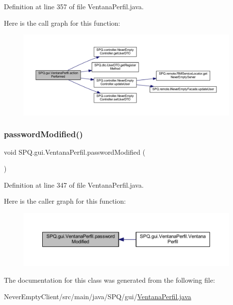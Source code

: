 Definition at line 357 of file Ventana\+Perfil.\+java.

Here is the call graph for this function\+:
\nopagebreak
\begin{figure}[H]
\begin{center}
\leavevmode
\includegraphics[width=350pt]{class_s_p_q_1_1gui_1_1_ventana_perfil_ab3748a16025307c203ba1dd2c5385b23_cgraph}
\end{center}
\end{figure}
\mbox{\label{class_s_p_q_1_1gui_1_1_ventana_perfil_a65b1807fdef3dcfdaf5564d2148fc46d}} 
\subsubsection{\texorpdfstring{password\+Modified()}{passwordModified()}}
{\footnotesize\ttfamily void S\+P\+Q.\+gui.\+Ventana\+Perfil.\+password\+Modified (\begin{DoxyParamCaption}{ }\end{DoxyParamCaption})}



Definition at line 347 of file Ventana\+Perfil.\+java.

Here is the caller graph for this function\+:
\nopagebreak
\begin{figure}[H]
\begin{center}
\leavevmode
\includegraphics[width=350pt]{class_s_p_q_1_1gui_1_1_ventana_perfil_a65b1807fdef3dcfdaf5564d2148fc46d_icgraph}
\end{center}
\end{figure}


The documentation for this class was generated from the following file\+:\begin{DoxyCompactItemize}
\item 
Never\+Empty\+Client/src/main/java/\+S\+P\+Q/gui/\mbox{\hyperlink{_ventana_perfil_8java}{Ventana\+Perfil.\+java}}\end{DoxyCompactItemize}
